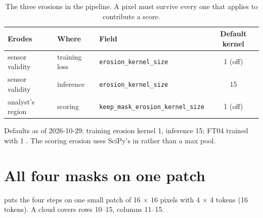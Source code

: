 \begin{table}[htbp]\centering
\caption{The three erosions in the pipeline. A pixel must survive every one that applies to contribute
a score.}\label{tab:masking:erosions}
\begin{tabular}{@{}lllc@{}}\toprule
Erodes & Where & Field & Default kernel \\\midrule
sensor validity & training loss & \texttt{erosion\_kernel\_size} & 1 (off) \\
sensor validity & inference & \texttt{erosion\_kernel\_size} & 15 \\
analyst's region & scoring & \texttt{keep\_mask\_erosion\_kernel\_size} & 1 (off) \\\bottomrule
\end{tabular}
\end{table}

\begin{drift}
Defaults as of 2026-10-29: training erosion kernel 1,
inference 15; FT04 trained with 1
. The scoring erosion uses
SciPy's  in  rather than a max pool.
\end{drift}


\section{All four masks on one patch}\label{sec:masking:all}

 puts the four steps on one small patch of 16 $\times$ 16 pixels with 4
$\times$ 4 tokens (16 tokens). A cloud covers rows 10--15, columns 11--15.

